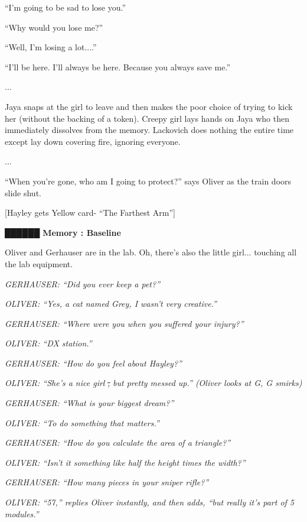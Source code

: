``I'm going to be sad to lose you.''

``Why would you lose me?''

``Well, I'm losing a lot....''

``I'll be here.  I'll always be here.  Because you always save me.''

...

Jaya snaps at the girl to leave and then makes the poor choice of trying to kick her (without the backing of a token).  Creepy girl lays hands on Jaya who then immediately dissolves from the memory.   Lackovich does nothing the entire time except lay down covering fire, ignoring everyone. 

...

``When you're gone, who am I going to protect?'' says Oliver as the train doors slide shut.



{[}Hayley gets Yellow card- ``The Farthest Arm''{]}



 {\LARGE \textbf{ {\color[RGB]{51,51,51}██████} } }  {\LARGE \textbf{ Memory : Baseline} } 



Oliver and Gerhauser are in the lab.  Oh, there's also the little girl... touching all the lab equipment. 

\textit{GERHAUSER: ``Did you ever keep a pet?''}

\textit{OLIVER: ``Yes, a cat named Grey, I wasn't very creative.''}

\textit{GERHAUSER: ``Where were you when you suffered your injury?''}

\textit{OLIVER: ``DX station.''}

\textit{GERHAUSER: ``How do you feel about Hayley?''}

\textit{OLIVER: ``She's a nice girl}\sout{ \textit{,} }\textit{ but pretty messed up.'' (Oliver looks at G, G smirks)}

\textit{GERHAUSER: ``What is your biggest dream?''}

\textit{OLIVER: ``To do something that matters.''}

\textit{GERHAUSER: ``How do you calculate the area of a triangle?''}

\textit{OLIVER: ``Isn't it something like half the height times the width?''}

\textit{GERHAUSER: ``How many pieces in your sniper rifle?''}

\textit{OLIVER: ``57,'' replies Oliver instantly, and then adds, ``but really it's part of 5 modules.''}

